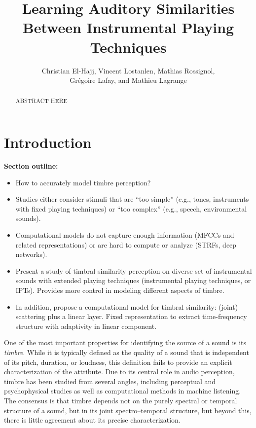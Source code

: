 \documentclass{article}
\title{Learning Auditory Similarities Between Instrumental Playing Techniques}
\author{
Christian El-Hajj,
Vincent Lostanlen,
Mathias Rossignol, \\
Gr\'egoire Lafay,
and Mathieu Lagrange}
\begin{document}
\maketitle


\begin{abstract}
ABSTRACT HERE
\end{abstract}


\section{Introduction}
\label{sec:introduction}

\textbf{Section outline:}
\begin{itemize}
\item How to accurately model timbre perception?
\item Studies either consider stimuli that are ``too simple'' (e.g., tones, instruments with fixed playing techniques) or ``too complex'' (e.g., speech, environmental sounds).
\item Computational models do not capture enough information (MFCCs and related representations) or are hard to compute or analyze (STRFs, deep networks).
\item Present a study of timbral similarity perception on diverse set of instrumental sounds with extended playing techniques (instrumental playing techniques, or IPTs). Provides more control in modeling different aspects of timbre.
\item In addition, propose a computational model for timbral similarity: (joint) scattering plus a linear layer. Fixed representation to extract time-frequency structure with adaptivity in linear component.
\end{itemize}

One of the most important properties for identifying the source of a sound is its \emph{timbre}.
While it is typically defined as the quality of a sound that is independent of its pitch, duration, or loudness, this definition fails to provide an explicit characterization of the attribute.
Due to its central role in audio perception, timbre has been studied from several angles, including perceptual and psychophysical studies as well as computational methods in machine listening.
The consensus is that timbre depends not on the purely spectral or temporal structure of a sound, but in its joint spectro--temporal structure, but beyond this, there is little agreement about its precise characterization.
\end{document}
